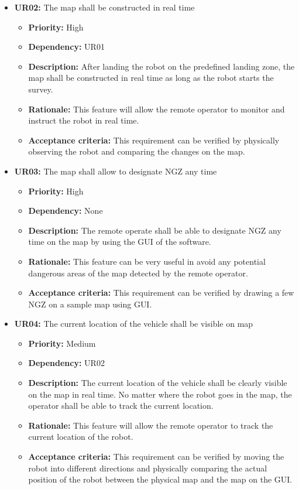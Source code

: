 \documentclass[10pt,a4paper,titlepage]{article}
\begin{document}
    \begin{itemize}
		\item \textbf{UR02:} The map shall be constructed in real time
		\begin{itemize}
			\item \textbf{Priority:} High
            \item \textbf{Dependency:} UR01
			\item \textbf{Description:} After landing the robot on the predefined landing zone, the map shall be constructed in real time as long as the robot starts the survey. 
            \item \textbf{Rationale:} This feature will allow the remote operator to monitor and instruct the robot in real time. 
            \item \textbf{Acceptance criteria:} This requirement can be verified by physically observing the robot and comparing the changes on the map. 
		\end{itemize} 
	\end{itemize}
    \begin{itemize}
		\item \textbf{UR03:} The map shall allow to designate NGZ any time
		\begin{itemize}
			\item \textbf{Priority:} High
            \item \textbf{Dependency:} None
			\item \textbf{Description:}  The remote operate shall be able to designate NGZ any time on the map by using the GUI of the software. 
            \item \textbf{Rationale:} This feature can be very useful in avoid any potential dangerous areas of the map detected by the remote operator. 
            \item \textbf{Acceptance criteria:} This requirement can be verified by drawing a few NGZ on a sample map using GUI. 
		\end{itemize} 
	\end{itemize}
	\begin{itemize}
		\item \textbf{UR04:} The current location of the vehicle shall be visible on map
		\begin{itemize}
			\item \textbf{Priority:} Medium
            \item \textbf{Dependency:} UR02
			\item \textbf{Description:}  The current location of the vehicle shall be clearly visible on the map in real time. No matter where the robot goes in the map, the operator shall be able to track the current location.  
            \item \textbf{Rationale:} This feature will allow the remote operator to track the current location of the robot.   
            \item \textbf{Acceptance criteria:} This requirement can be verified by moving the robot into different directions and physically comparing the actual position of the robot between the physical map and the map on the GUI. 
		\end{itemize} 
	\end{itemize}
\end{document}
